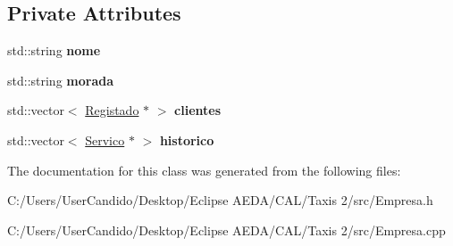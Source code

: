 \subsection*{Private Attributes}
\begin{DoxyCompactItemize}
\item 
\hypertarget{class_empresa_affa32f93b722be794531dbfb26cb19b3}{}\label{class_empresa_affa32f93b722be794531dbfb26cb19b3} 
std\+::string {\bfseries nome}
\item 
\hypertarget{class_empresa_a73cf106d1c427875d58d7adc0ff298e8}{}\label{class_empresa_a73cf106d1c427875d58d7adc0ff298e8} 
std\+::string {\bfseries morada}
\item 
\hypertarget{class_empresa_aed45bb351ecd8503398d43c7da1487f8}{}\label{class_empresa_aed45bb351ecd8503398d43c7da1487f8} 
std\+::vector$<$ \hyperlink{class_registado}{Registado} $\ast$ $>$ {\bfseries clientes}
\item 
\hypertarget{class_empresa_ae8b0f4fece7e5c01d136ab79418f728b}{}\label{class_empresa_ae8b0f4fece7e5c01d136ab79418f728b} 
std\+::vector$<$ \hyperlink{class_servico}{Servico} $\ast$ $>$ {\bfseries historico}
\end{DoxyCompactItemize}


The documentation for this class was generated from the following files\+:\begin{DoxyCompactItemize}
\item 
C\+:/\+Users/\+User\+Candido/\+Desktop/\+Eclipse A\+E\+D\+A/\+C\+A\+L/\+Taxis 2/src/Empresa.\+h\item 
C\+:/\+Users/\+User\+Candido/\+Desktop/\+Eclipse A\+E\+D\+A/\+C\+A\+L/\+Taxis 2/src/Empresa.\+cpp\end{DoxyCompactItemize}
